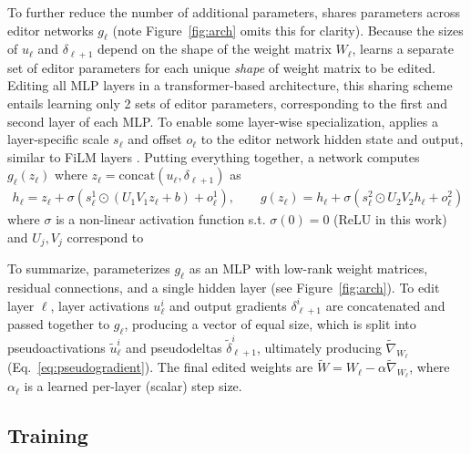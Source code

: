 \documentclass{article}
\begin{document}
To further reduce the number of additional parameters, {\name} shares parameters across editor networks $g_\ell$ (note Figure~\ref{fig:arch} omits this for clarity). Because the sizes of $u_\ell$ and $\delta_{\ell+1}$ depend on the shape of the weight matrix $W_\ell$, {\name} learns a separate set of editor parameters for each unique \textit{shape} of weight matrix to be edited. Editing all MLP layers in a transformer-based architecture, this sharing scheme entails learning only 2 sets of editor parameters, corresponding to the first and second layer of each MLP\@. To enable some layer-wise specialization, {\name} applies a layer-specific scale $s_\ell$ and offset $o_\ell$ to the editor network hidden state and output,  similar to FiLM layers \citep{perez2018film}. Putting everything together, a {\name} network computes $g_\ell(z_\ell)$ where $z_\ell =\text{concat}(u_\ell, \delta_{\ell+1})$ as
\begin{subequations}
    \label{eq:mend-forward}
    \begin{gather}
        h_\ell  = z_\ell  + \sigma(s^1_\ell \odot (U_1V_1 z_\ell + b) + o^1_\ell),\quad\quad
        g(z_\ell) = h_\ell + \sigma(s^2_\ell \odot U_2V_2 h_\ell + o^2_\ell) \tag{\theequation a,b}
    \end{gather}
\end{subequations}
where $\sigma$ is a non-linear activation function s.t. $\sigma(0) = 0$ (ReLU in this work) and $U_j,V_j$ correspond to 

To summarize, {\name} parameterizes $g_\ell$ as an MLP with low-rank weight matrices, residual connections, and a single hidden layer (see Figure~\ref{fig:arch}). To edit layer $\ell$, layer activations $u_\ell^i$ and output gradients $\delta_{\ell+1}^i$ are concatenated and passed together to $g_\ell$, producing a vector of equal size, which is split into pseudoactivations $\tilde u_\ell^i$ and pseudodeltas $\tilde \delta_{\ell+1}^i$, ultimately producing $\tilde{\nabla}_{W_\ell}$ (Eq.~\ref{eq:pseudogradient}). The final edited weights are $\tilde W = W_\ell - \alpha\tilde{\nabla}_{W_\ell}$, where $\alpha_\ell$ is a learned per-layer (scalar) step size.

\subsection{Training \name}


\end{document}
